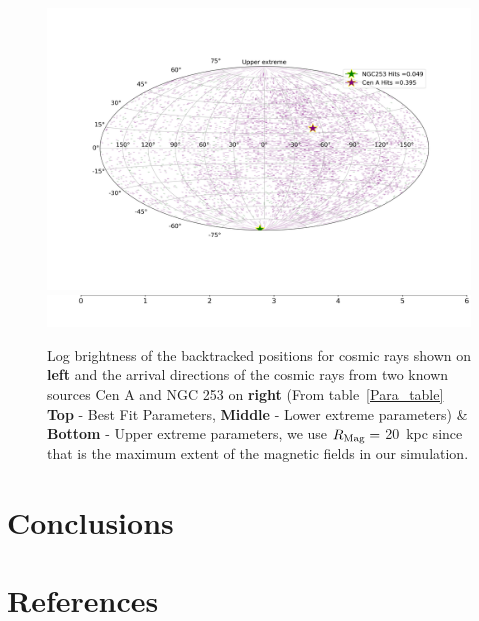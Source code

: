 \documentclass[12pt, a4 paper]{mnras}
\begin{document}
\begin{figure}
\includegraphics[width=0.49\linewidth]{Images/Bins_180_UB_N2_CenA_NGC253_Str_Tur_TM_40_EeV.png}
\includegraphics[width=0.49\linewidth]{Images/Colorbar.png}
\caption{Log brightness of the backtracked positions for cosmic rays shown on \textbf{left} and the arrival directions of the cosmic rays from two known sources Cen A and NGC 253 on \textbf{right} (From table~\ref{Para_table} \textbf{Top} - Best Fit Parameters, {\textbf{Middle} - Lower extreme parameters)} \& {\textbf{Bottom} - Upper extreme parameters, we use $R_{\rm Mag} = $ 20~kpc since that is the maximum extent of the magnetic fields in our simulation.}}
\label{fig:AD_Plots}
\end{figure}

\section{Conclusions}
\label{Conclusions}

\section{References}

\printbibliography[heading=none]

\nocite{*}
\end{document}
